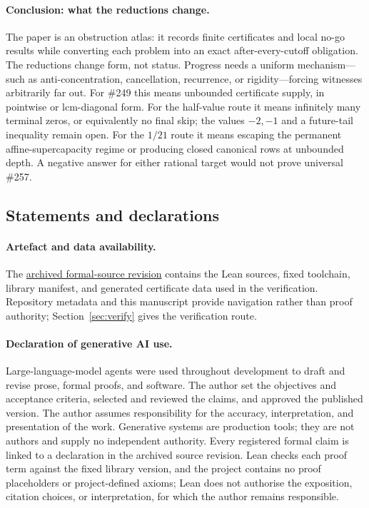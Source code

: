 \documentclass[11pt]{article}
\newcommand{\commit}{99f4bf47422abbd8757cbb22b50ba079d764d3a7}
\newcommand{\sourceurl}{https://github.com/wcook04/plectis-erdos/tree/\commit}
\theoremstyle{definition}
\theoremstyle{remark}
\begin{document}
\paragraph{Conclusion: what the reductions change.}
The paper is an obstruction atlas: it records finite certificates and local
no-go results while converting each problem into an exact after-every-cutoff
obligation.  The reductions change form, not status.  Progress needs a uniform
mechanism---such as anti-concentration, cancellation, recurrence, or
rigidity---forcing witnesses arbitrarily far out.  For \#249 this means
unbounded certificate supply, in pointwise or lcm-diagonal form.  For the
half-value route it means infinitely many terminal zeros, or equivalently no
final skip; the values \(-2,-1\) and a future-tail inequality remain open.
For the \(1/21\) route it means escaping the permanent affine-supercapacity
regime or producing closed canonical rows at unbounded depth.  A negative
answer for either rational target would not prove universal \#257.

\subsection*{Statements and declarations}

\paragraph{Artefact and data availability.} The
\href{\sourceurl}{archived formal-source revision} contains the Lean sources,
fixed toolchain, library manifest, and generated certificate data used in the
verification. Repository metadata and this manuscript provide navigation
rather than proof authority; Section~\ref{sec:verify} gives the verification
route.

\paragraph{Declaration of generative AI use.} Large-language-model agents were
used throughout development to draft and revise prose, formal proofs, and
software.  The author set the objectives and acceptance criteria, selected and
reviewed the claims, and approved the published version.  The author assumes
responsibility for the accuracy, interpretation, and presentation of the work.
Generative systems are production tools; they are not authors and supply no
independent authority.  Every registered formal claim is linked to a
declaration in the archived source revision.  Lean checks each proof term
against the fixed library version, and the project contains no proof
placeholders or project-defined axioms; Lean does not authorise the exposition,
citation choices, or interpretation, for which the author remains responsible.
\end{document}
